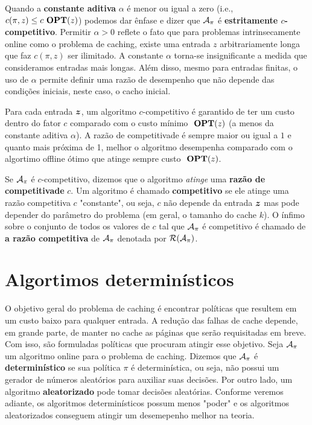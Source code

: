 Quando a \textbf{constante aditiva} \(\alpha\) é menor ou igual a zero (i.e., \(c(\pi, z) \le c \ \textbf{OPT}(z)\)) podemos dar ênfase e dizer que \(\mathcal{A}_\pi\) é \textbf{estritamente \(c\)-competitivo}. Permitir \(\alpha > 0\) reflete o fato que para problemas intrinsecamente online como o problema de caching, existe uma entrada \(z\) arbitrariamente longa que faz \(c(\pi, z)\) ser ilimitado. A constante \(\alpha\) torna-se insignificante a medida que consideramos entradas mais longas. Além disso, mesmo para entradas finitas, o uso de \(\alpha\) permite definir uma razão de desempenho que não depende das condições iniciais, neste caso, o cacho inicial. 

Para cada entrada \(\bm{z}\), um algoritmo \(c\)-competitivo é garantido de ter um custo dentro do fator \(c\) comparado com o custo mínimo \(\ \textbf{OPT}(z)\) (a menos da constante aditiva \(\alpha\)). A razão de competitivade é sempre maior ou igual a \(1\) e quanto mais próxima de 1, melhor o algoritmo desempenha comparado com o algortimo offline ótimo que atinge sempre custo \(\ \textbf{OPT}(z)\).

Se \(\mathcal{A}_\pi\) é \(c\)-competitivo, dizemos que o algoritmo \emph{atinge} uma \textbf{razão de competitivade} \(c\). Um algoritmo é chamado \textbf{competitivo} se ele atinge uma razão competitiva \(c\) "constante", ou seja, \(c\) não depende da entrada \(\bm{z}\) mas pode depender do parâmetro do problema (em geral, o tamanho do cache \(k\)). O ínfimo sobre o conjunto de todos os valores de \(c\) tal que \(\mathcal{A}_\pi\) é competitivo é chamado de \textbf{a razão competitiva} de \(\mathcal{A}_\pi\) denotada por \(\mathcal{R}(\mathcal{A}_\pi)\).

\section{Algortimos determinísticos}

O objetivo geral do problema de caching é encontrar políticas que resultem em um custo baixo para qualquer entrada. A redução das falhas de cache depende, em grande parte, de manter no cache as páginas que serão requisitadas em breve. Com isso, são formuladas políticas que procuram atingir esse objetivo. Seja \(\mathcal{A}_\pi\) um algoritmo online para o problema de caching. Dizemos que \(\mathcal{A}_\pi\) é \textbf{determinístico} se sua política \(\pi\) é determinística, ou seja, não possui um gerador de números aleatórios para auxiliar suas decisões. Por outro lado, um algoritmo \textbf{aleatorizado} pode tomar decisões aleatórias. Conforme veremos adiante, os algoritmos determinísticos possum menos "poder" e os algoritmos aleatorizados conseguem atingir um desemepenho melhor na teoria. 

